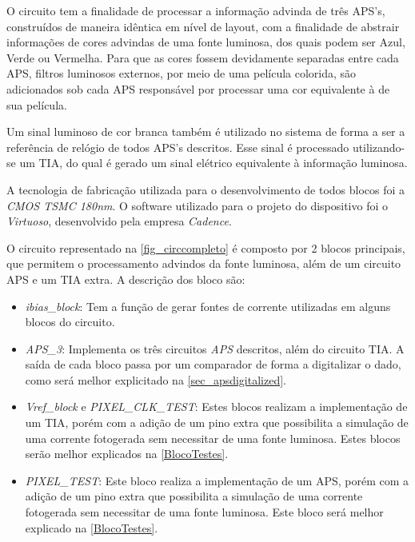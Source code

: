 O circuito tem a finalidade de processar a informação advinda de tr\^es APS's, constru\'idos de maneira id\^entica em n\'ivel de layout, com a finalidade de abstrair informações de cores advindas de uma fonte luminosa, dos quais podem ser Azul, Verde ou Vermelha. Para que as cores fossem devidamente separadas entre cada APS, filtros luminosos externos, por meio de uma pel\'icula colorida, são adicionados sob cada APS respons\'avel por processar uma cor equivalente \`a de sua pel\'icula.

Um sinal luminoso de cor branca tamb\'em \'e utilizado no sistema de forma a ser a refer\^encia de rel\'ogio de todos APS's descritos. Esse sinal \'e processado utilizando-se um TIA, do qual \'e gerado um sinal el\'etrico equivalente \`a informação luminosa.

A tecnologia de fabricação utilizada para o desenvolvimento de todos blocos foi a \textit{CMOS TSMC 180nm}. O software utilizado para o projeto do dispositivo foi o \textit{Virtuoso}, desenvolvido pela empresa \textit{Cadence}.

O circuito representado na \autoref{fig_circcompleto} \'e composto por 2 blocos principais, que permitem o processamento advindos da fonte luminosa, al\'em de um circuito APS e um TIA extra. A descrição dos bloco são:

\begin{itemize}
    \item \textit{ibias\_block}: Tem a função de gerar fontes de corrente utilizadas em alguns blocos do circuito.
    
    \item \textit{APS\_3}: Implementa os tr\^es circuitos \textit{APS} descritos, al\'em do circuito TIA. A sa\'ida de cada bloco passa por um comparador de forma a digitalizar o dado, como ser\'a melhor explicitado na \autoref{sec_apsdigitalized}.
    
    \item \textit{Vref\_block} e \textit{PIXEL\_CLK\_TEST}: Estes blocos realizam a implementação de um TIA, por\'em com a adição de um pino extra que possibilita a simulação de uma corrente fotogerada sem necessitar de uma fonte luminosa. Estes blocos serão melhor explicados na \autoref{BlocoTestes}. 
    
    \item \textit{PIXEL\_TEST}: Este bloco realiza a implementação de um APS, por\'em com a adição de um pino extra que possibilita a simulação de uma corrente fotogerada sem necessitar de uma fonte luminosa. Este bloco será melhor explicado na \autoref{BlocoTestes}.
    
\end{itemize}

